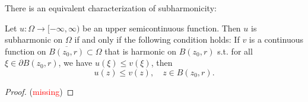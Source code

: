 There is an equivalent characterization of subharmonicity:
\begin{theorem}\label{Harmonic comparison characterization}
Let $u:\Omega\rightarrow [-\infty,\infty)$ be an upper semicontinuous function. Then $u$ is 
subharmonic on $\Omega$ if and only if the following condition holds: If $v$ is a continuous function
on $\overline{B(z_0,r)}\subset \Omega$ that is harmonic on $B(z_0,r)$ s.t. for all 
$\xi\in \partial B(z_0,r)$, we have $u(\xi)\leq v(\xi)$, then 
\begin{equation*}
  u(z)\leq v(z),\quad z\in B(z_0,r).
\end{equation*}
\end{theorem}
\begin{proof}
(\textcolor{red}{missing})
\end{proof}

